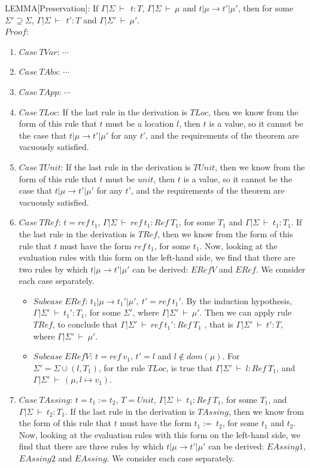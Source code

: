 \documentclass{article}
\newcommand{\tto}{\longrightarrow}
\newcommand{\envEP}{{\Gamma | \Sigma \ \vdash \ }}
\newcommand{\envEPP}{{\Gamma | \Sigma' \ \vdash \ }}
\begin{document}
LEMMA[Preservation]: If $\envEP \ t : T$, $\envEP \mu$ and $t|\mu \tto t'|\mu'$, then for some $\Sigma' \supseteq \Sigma$, $\envEP \ t' : T$ and $\envEPP \mu'$.\\
$Proof$:
\begin{enumerate}
\item $Case \ TVar$: $\cdots$
\item $Case \ TAbs$: $\cdots$
\item $Case \ TApp$: $\cdots$
\item $Case \ TLoc$: If the last rule in the derivation is $TLoc$, then we know from the form of this rule that $t$ must be a location $l$, then $t$ is a value, so it cannot be the case that $t | \mu \tto t'| \mu'$ for any $t'$, and the requirements of the theorem are vacuously satisfied.
\item $Case \ TUnit$: If the last rule in the derivation is $TUnit$, then we know from the form of this rule that $t$ must be $unit$, then $t$ is a value, so it cannot be the case that $t | \mu \tto t'| \mu'$ for any $t'$, and the requirements of the theorem are vacuously satisfied.
\item $Case \ TRef$: $t = ref \ t_1$, $ \envEP ref \ t_1 : Ref \ T_1$, for some $T_1$ and $\envEP t_1 : T_1$. If the last rule in the derivation is $TRef$, then we know from the form of this rule that $t$ must have the form $ref \ t_1$, for some $t_1$. Now, looking at the evaluation rules with this form on the left-hand side, we find that there are two rules by which $t|\mu \tto t'|\mu'$ can be derived: $ERefV$ and $ERef$. We consider each case separately.
\begin{itemize}
\item $Subcase \ ERef$: $t_1|\mu \tto t_1'|\mu', \ t' = ref \ t_1'$. By the induction hypothesis, $\envEPP t_1' : T_1$, for some $\Sigma'$,  where $\envEPP \mu'$. Then we can apply rule $TRef$, to conclude that $\envEPP ref \ t_1' : Ref \ T_1 $ , that is $\envEPP t' : T$, where $\envEPP \mu'$.
\item $Subcase \ ERefV$: $t = ref \ v_1$, $t' = l$ and $l \not\in dom(\mu)$. For $\Sigma' = \Sigma \cup (l, T_1)$, for the rule $TLoc$, is true that $\envEPP l : Ref \ T_1$, and $\envEPP (\mu, l \mapsto v_1)$.
\end{itemize}
\item $Case \ TAssing$: $t = t_1:= t_2$, $T = Unit$, $\envEP t_1 : Ref \ T_1$, for some $T_1$, and $\envEP t_2 : T_1$. If the last rule in the derivation is $TAssing$, then we know from the form of this rule that $t$ must have the form $t_1:= \ t_2$, for some $t_1$ and $t_2$. Now, looking at the evaluation rules with this form on the left-hand side, we find that there are three rules by which $t|\mu \tto t'|\mu'$ can be derived: $EAssing1$, $EAssing2$ and $EAssing$. We consider each case separately.

\end{enumerate}
\end{document}
